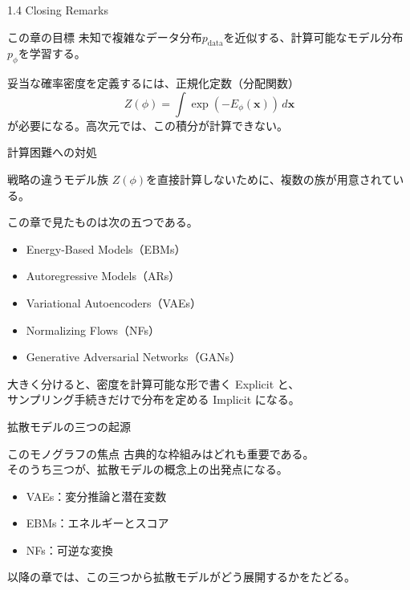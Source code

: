 \begin{frame}{1.4 Closing Remarks}
    \begin{block}{この章の目標}
        未知で複雑なデータ分布\(p_{\mathrm{data}}\)を近似する、計算可能なモデル分布\(p_{\phi}\)を学習する。
    \end{block}
    \vspace{0.8em}
    妥当な確率密度を定義するには、正規化定数（分配関数）
    \[
        Z(\phi)=\int \exp(-\mathit{E}_{\phi}(\boldsymbol{x}))\,d\boldsymbol{x}
    \]
    が必要になる。高次元では、この積分が計算できない。
\end{frame}
\begin{frame}{計算困難への対処}
    \begin{block}{戦略の違うモデル族}
        \(Z(\phi)\)を直接計算しないために、複数の族が用意されている。
    \end{block}
    \vspace{0.6em}
    この章で見たものは次の五つである。
    \begin{itemize}
        \item Energy-Based Models（EBMs）
        \item Autoregressive Models（ARs）
        \item Variational Autoencoders（VAEs）
        \item Normalizing Flows（NFs）
        \item Generative Adversarial Networks（GANs）
    \end{itemize}
    \vspace{0.4em}
    大きく分けると、密度を計算可能な形で書く Explicit と、\\
    サンプリング手続きだけで分布を定める Implicit になる。
\end{frame}
\begin{frame}{拡散モデルの三つの起源}
    \begin{exampleblock}{このモノグラフの焦点}
        古典的な枠組みはどれも重要である。\\
        そのうち三つが、拡散モデルの概念上の出発点になる。
    \end{exampleblock}
    \vspace{0.8em}
    \begin{itemize}
        \item VAEs：変分推論と潜在変数
        \item EBMs：エネルギーとスコア
        \item NFs：可逆な変換
    \end{itemize}
    \vspace{0.6em}
    以降の章では、この三つから拡散モデルがどう展開するかをたどる。
\end{frame}

